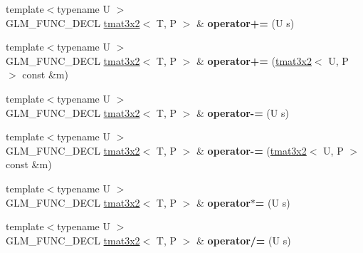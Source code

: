 \begin{DoxyCompactItemize}
\item 
\mbox{\label{structglm_1_1tmat3x2_a20c86d9ea265c20b6605d28b2d84fd3a}} 
{\footnotesize template$<$typename U $>$ }\\G\+L\+M\+\_\+\+F\+U\+N\+C\+\_\+\+D\+E\+CL \hyperlink{structglm_1_1tmat3x2}{tmat3x2}$<$ T, P $>$ \& {\bfseries operator+=} (U s)
\item 
\mbox{\label{structglm_1_1tmat3x2_a75faae5987f07b3f08a1843c3b6a71f0}} 
{\footnotesize template$<$typename U $>$ }\\G\+L\+M\+\_\+\+F\+U\+N\+C\+\_\+\+D\+E\+CL \hyperlink{structglm_1_1tmat3x2}{tmat3x2}$<$ T, P $>$ \& {\bfseries operator+=} (\hyperlink{structglm_1_1tmat3x2}{tmat3x2}$<$ U, P $>$ const \&m)
\item 
\mbox{\label{structglm_1_1tmat3x2_a5ecf048090305a4539010afcb534654b}} 
{\footnotesize template$<$typename U $>$ }\\G\+L\+M\+\_\+\+F\+U\+N\+C\+\_\+\+D\+E\+CL \hyperlink{structglm_1_1tmat3x2}{tmat3x2}$<$ T, P $>$ \& {\bfseries operator-\/=} (U s)
\item 
\mbox{\label{structglm_1_1tmat3x2_a83a6c7b5f90654989b78deda2e1ccf20}} 
{\footnotesize template$<$typename U $>$ }\\G\+L\+M\+\_\+\+F\+U\+N\+C\+\_\+\+D\+E\+CL \hyperlink{structglm_1_1tmat3x2}{tmat3x2}$<$ T, P $>$ \& {\bfseries operator-\/=} (\hyperlink{structglm_1_1tmat3x2}{tmat3x2}$<$ U, P $>$ const \&m)
\item 
\mbox{\label{structglm_1_1tmat3x2_a00ce13519a2e6415da2fb8d363fc065b}} 
{\footnotesize template$<$typename U $>$ }\\G\+L\+M\+\_\+\+F\+U\+N\+C\+\_\+\+D\+E\+CL \hyperlink{structglm_1_1tmat3x2}{tmat3x2}$<$ T, P $>$ \& {\bfseries operator$\ast$=} (U s)
\item 
\mbox{\label{structglm_1_1tmat3x2_a824a792e163b060114a4df6f1de292a9}} 
{\footnotesize template$<$typename U $>$ }\\G\+L\+M\+\_\+\+F\+U\+N\+C\+\_\+\+D\+E\+CL \hyperlink{structglm_1_1tmat3x2}{tmat3x2}$<$ T, P $>$ \& {\bfseries operator/=} (U s)
\item 
\mbox{\label{structglm_1_1tmat3x2_a8ef0fdf574941e87f0e7da6b36304f97}} 

\end{DoxyCompactItemize}
